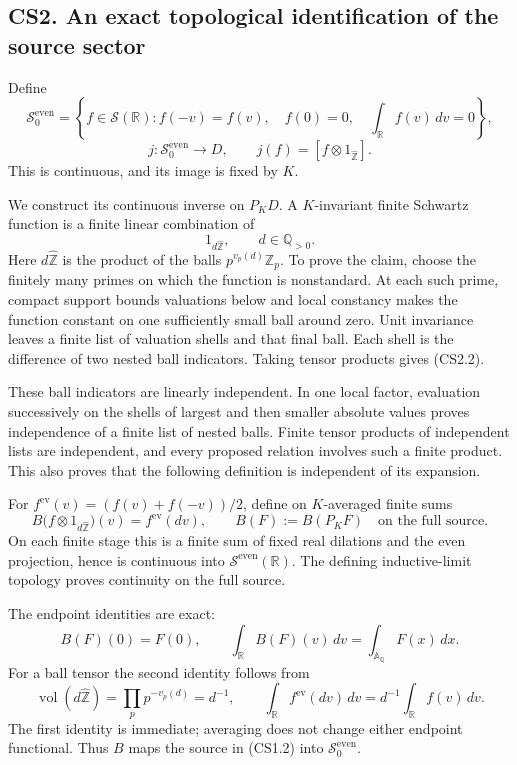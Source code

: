 \subsection{CS2. An exact topological identification of the source
sector}\label{cs2.-an-exact-topological-identification-of-the-source-sector}

Define \[
\mathcal S_0^{\mathrm{even}}
=\left\{f\in\mathcal S(\mathbb R):
f(-v)=f(v),\quad f(0)=0,\quad\int_{\mathbb R}f(v)\,dv=0\right\},
\] \[
j:\mathcal S_0^{\mathrm{even}}\longrightarrow D,\qquad
j(f)=[f\otimes1_{\widehat{\mathbb Z}}].
\tag{CS2.1}
\] This is continuous, and its image is fixed by \(K\).

We construct its continuous inverse on \(P_KD\). A \(K\)-invariant
finite Schwartz function is a finite linear combination of \[
1_{d\widehat{\mathbb Z}},\qquad d\in\mathbb Q_{>0}.
\tag{CS2.2}
\] Here \(d\widehat{\mathbb Z}\) is the product of the balls
\(p^{v_p(d)}\mathbb Z_p\). To prove the claim, choose the finitely many
primes on which the function is nonstandard. At each such prime, compact
support bounds valuations below and local constancy makes the function
constant on one sufficiently small ball around zero. Unit invariance
leaves a finite list of valuation shells and that final ball. Each shell
is the difference of two nested ball indicators. Taking tensor products
gives (CS2.2).

These ball indicators are linearly independent. In one local factor,
evaluation successively on the shells of largest and then smaller
absolute values proves independence of a finite list of nested balls.
Finite tensor products of independent lists are independent, and every
proposed relation involves such a finite product. This also proves that
the following definition is independent of its expansion.

For \(f^{\mathrm{ev}}(v)=(f(v)+f(-v))/2\), define on \(K\)-averaged
finite sums \[
B\bigl(f\otimes1_{d\widehat{\mathbb Z}}\bigr)(v)
=f^{\mathrm{ev}}(dv),
\qquad
B(F):=B(P_KF)
\quad\text{on the full source.}
\tag{CS2.3}
\] On each finite stage this is a finite sum of fixed real dilations and
the even projection, hence is continuous into
\(\mathcal S^{\mathrm{even}}(\mathbb R)\). The defining inductive-limit
topology proves continuity on the full source.

The endpoint identities are exact: \[
B(F)(0)=F(0),\qquad
\int_{\mathbb R}B(F)(v)\,dv
=\int_{\mathbb A_{\mathbb Q}}F(x)\,dx.
\tag{CS2.4}
\] For a ball tensor the second identity follows from \[
\operatorname{vol}(d\widehat{\mathbb Z})
=\prod_p p^{-v_p(d)}=d^{-1},
\qquad
\int_{\mathbb R}f^{\mathrm{ev}}(dv)\,dv
=d^{-1}\int_{\mathbb R}f(v)\,dv.
\tag{CS2.5}
\] The first identity is immediate; averaging does not change either
endpoint functional. Thus \(B\) maps the source in (CS1.2) into
\(\mathcal S_0^{\mathrm{even}}\).

